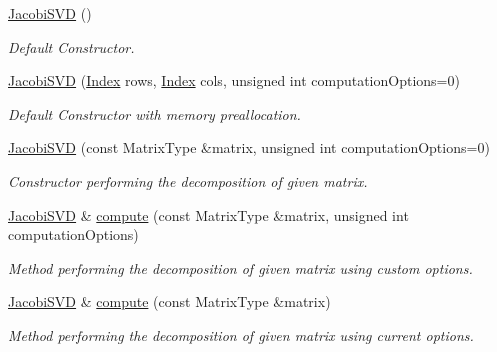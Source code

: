 \begin{DoxyCompactItemize}
\hyperlink{group___s_v_d___module_a55315ab9cd060019a5ad07be798ff3b9}{Jacobi\+S\+VD} ()
\begin{DoxyCompactList}\small\item\em Default Constructor. \end{DoxyCompactList}\item 
\hyperlink{group___s_v_d___module_a5d9ea7c8f361337727260efd77ee03ac}{Jacobi\+S\+VD} (\hyperlink{group___s_v_d___module_a6229a37997eca1072b52cca5ee7a2bec}{Index} rows, \hyperlink{group___s_v_d___module_a6229a37997eca1072b52cca5ee7a2bec}{Index} cols, unsigned int computation\+Options=0)
\begin{DoxyCompactList}\small\item\em Default Constructor with memory preallocation. \end{DoxyCompactList}\item 
\hyperlink{group___s_v_d___module_abfd1dd454a6e3edec7feecd97c818a78}{Jacobi\+S\+VD} (const Matrix\+Type \&matrix, unsigned int computation\+Options=0)
\begin{DoxyCompactList}\small\item\em Constructor performing the decomposition of given matrix. \end{DoxyCompactList}\item 
\hyperlink{group___s_v_d___module_class_eigen_1_1_jacobi_s_v_d}{Jacobi\+S\+VD} \& \hyperlink{group___s_v_d___module_a0446cd26490736510bc7be243b882060}{compute} (const Matrix\+Type \&matrix, unsigned int computation\+Options)
\begin{DoxyCompactList}\small\item\em Method performing the decomposition of given matrix using custom options. \end{DoxyCompactList}\item 
\hyperlink{group___s_v_d___module_class_eigen_1_1_jacobi_s_v_d}{Jacobi\+S\+VD} \& \hyperlink{group___s_v_d___module_acc7b9a4068cf7b69ae3227d217ed7efd}{compute} (const Matrix\+Type \&matrix)
\begin{DoxyCompactList}\small\item\em Method performing the decomposition of given matrix using current options. \end{DoxyCompactList}\end{DoxyCompactItemize}

